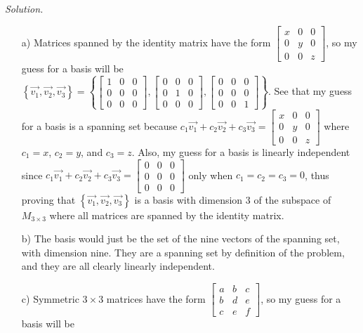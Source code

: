 \documentclass[12pt]{article}
\begin{document}
\begin{itemize}
\textit{Solution.}
\begin{itemize}
\item[a)] Matrices spanned by the identity matrix have the form 
$\left[\begin{array}{ccc} x & 0 & 0 \\ 0 & y & 0 \\ 0 & 0 & z\end{array}\right]$, so my guess for a basis will be 
$\left\{ \vec{v_1}, \vec{v_2}, \vec{v_3} \right\} = \left\{
\left[\begin{array}{ccc} 1 & 0 & 0 \\ 0 & 0 & 0 \\ 0 & 0 & 0\end{array}\right], 
\left[\begin{array}{ccc} 0 & 0 & 0 \\ 0 & 1 & 0 \\ 0 & 0 & 0\end{array}\right],
\left[\begin{array}{ccc} 0 & 0 & 0 \\ 0 & 0 & 0 \\ 0 & 0 & 1\end{array}\right]\right\}$.
See that my guess for a basis is a spanning set because $c_1\vec{v_1} + c_2\vec{v_2}+ c_3\vec{v_3}=
\left[\begin{array}{ccc} x & 0 & 0 \\ 0 & y & 0 \\ 0 & 0 & z\end{array}\right]$ where $c_1=x$, $c_2=y$, and $c_3=z$.
Also, my guess for a basis is linearly independent since $c_1\vec{v_1} + c_2\vec{v_2}+ c_3\vec{v_3}=
\left[\begin{array}{ccc} 0 & 0 & 0 \\ 0 & 0 & 0 \\ 0 & 0 & 0\end{array}\right]$ only when $c_1=c_2=c_3=0$, thus proving that $\left\{ \vec{v_1}, \vec{v_2}, \vec{v_3} \right\}$ is a basis with dimension 3 of the subspace of $M_{3\times3}$ where all matrices are spanned by the identity matrix.
\item[b)] The basis would just be the set of the nine vectors of the spanning set, with dimension nine. They are a spanning set by definition of the problem, and they are all clearly linearly independent.
\item[c)] Symmetric $3 \times 3$ matrices have the form
$\left[\begin{array}{ccc} a & b & c \\ b & d & e \\ c & e & f\end{array}\right]$, so my guess for a basis will be

\end{itemize}
\end{itemize}
\end{document}
